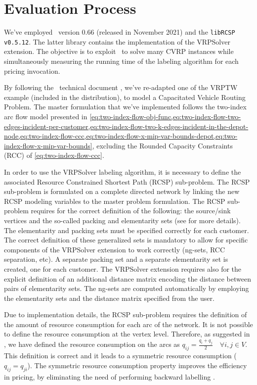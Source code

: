 \section{Evaluation Process}
\label{sec:results-evaluation-process}

We've employed \bapcod\ version 0.66 (released in November 2021) and the \texttt{libRCSP v0.5.12}.
The latter library contains the implementation of the VRPSolver extension.
The objective is to exploit \bapcod\ to solve many CVRP instances while simultaneously
measuring the running time of the labeling algorithm for each pricing invocation.

\medskip

By following the \bapcod\ technical document \parencite{sadykov2021},
we've re-adapted one of the VRPTW example (included in the distribution),
to model a Capacitated Vehicle Routing Problem.
The master formulation that we've implemented follows the two-index arc flow model
presented in \cref{eq:two-index-flow-obj-func,eq:two-index-flow-two-edges-incident-per-customer,eq:two-index-flow-two-k-edges-incident-in-the-depot-node,eq:two-index-flow-ccc,eq:two-index-flow-x-mip-var-bounds-depot,eq:two-index-flow-x-mip-var-bounds},
excluding the Rounded Capacity Constraints (RCC) of \cref{eq:two-index-flow-ccc}.

In order to use the VRPSolver labeling algorithm, it is necessary
to define the associated Resource Constrained Shortest Path (RCSP) sub-problem.
The RCSP sub-problem is formulated on a complete directed network by
linking the new RCSP modeling variables to the master problem formulation.
The RCSP sub-problem requires for the correct definition of the following:
the source/sink vertices and the so-called packing and elementarity sets
(see \cite{pessoa2020generic} for more details).
The elementarity and packing sets must be specified correctly for each customer.
The correct definition of these generalized sets is mandatory to allow for specific
components of the VRPSolver extension to work correctly (ng-sets, RCC separation, etc).
A separate packing set and a separate elementarity set is created, one for each customer.
The VRPSolver extension requires also for the explicit definition of an additional
distance matrix encoding the distance between pairs of elementarity sets.
The ng-sets are computed automatically by employing the elementarity sets
and the distance matrix specified from the user.

Due to implementation details, the RCSP sub-problem requires
the definition of the amount of resource consumption for each arc of the network.
It is not possible to define the resource consumption at the vertex level.
Therefore, as suggested in \textcite{pessoa2020generic}, we have defined the resource consumption
on the arcs as $q_{ij} = \frac{q_{i} + q_{j}}{2} \quad \forall i, j \in V$.
This definition is correct and it leads to a symmetric resource consumption ($q_{ij} = q_{ji}$).
The symmetric resource consumption property improves the efficiency in pricing,
by eliminating the need of performing backward labelling \parencite{pessoa2020generic}.

